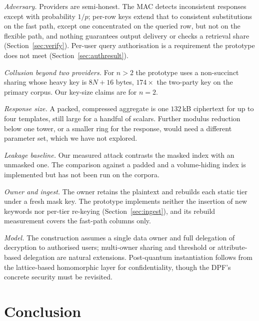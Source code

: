 \documentclass[a4paper,fleqn]{cas-dc}
\newif\ifauthorchecks
\newcommand{\authorcheck}[1]{\ifauthorchecks{\color{red}\textsf{[Authors: #1]}}\fi}
\begin{document}
\emph{Adversary.} Providers are semi-honest. The MAC detects inconsistent
responses except with probability $1/p$; per-row keys extend that to
consistent substitutions on the fast path, except one concentrated on the
queried row, but not on the flexible path, and nothing guarantees output
delivery or checks a retrieval share (Section~\ref{sec:verify}). Per-user query
authorisation is a requirement the prototype does not meet
(Section~\ref{sec:authresult}).

\emph{Collusion beyond two providers.} For $n>2$ the prototype uses a
non-succinct sharing whose heavy key is $8N+16$ bytes, $174\times$ the
two-party key on the primary corpus. Our key-size claims are for $n=2$.

\emph{Response size.} A packed, compressed aggregate is one $132$\,kB
ciphertext for up to four templates, still large for a handful of scalars.
Further modulus reduction below one tower, or a smaller ring for the response,
would need a different parameter set, which we have not explored.

\emph{Leakage baseline.} Our measured attack contrasts the masked index with an
unmasked one. The comparison against a padded and a volume-hiding index
\citep{kamara2019computationally,patel2019mitigating} is implemented but has
not been run on the corpora. \authorcheck{Run it; see
Section~\ref{sec:leakeval}.}

\emph{Owner and ingest.} The owner retains the plaintext and rebuilds each
static tier under a fresh mask key. The prototype implements neither the
insertion of new keywords nor per-tier re-keying (Section~\ref{sec:ingest}),
and its rebuild measurement covers the fast-path columns only.

\emph{Model.} The construction assumes a single data owner and full delegation
of decryption to authorised users; multi-owner sharing and threshold or
attribute-based delegation are natural extensions. Post-quantum instantiation
follows from the lattice-based homomorphic layer for confidentiality, though
the DPF's concrete security must be revisited.

\section{Conclusion}
\label{sec:conclusion}
\end{document}
